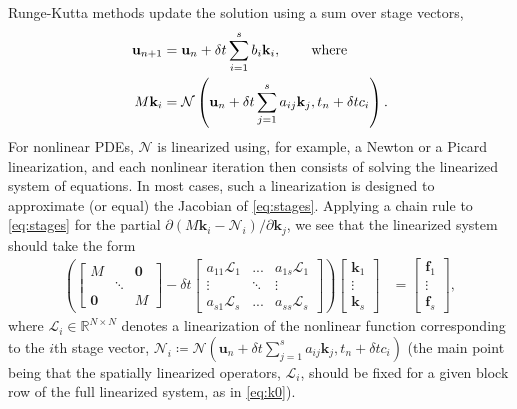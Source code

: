 \documentclass[a4paper,10pt]{article}
\begin{document}
Runge-Kutta methods update the solution using a sum over stage vectors,
%
\begin{align}\label{eq:update}
\mathbf{u}_{n+1} & = \mathbf{u}_n + \delta t \sum_{i=1}^s b_i\mathbf{k}_i, 
	\hspace{5ex}\textnormal{where}\\
M\mathbf{k}_i & = \mathcal{N}\left(\mathbf{u}_n + \delta t\sum_{j=1}^s a_{ij}\mathbf{k}_j, t_n+\delta tc_i\right).\label{eq:stages}
\end{align}
%
For nonlinear PDEs, $\mathcal{N}$ is linearized using, for example, a Newton or a
Picard linearization, and each nonlinear iteration then consists of solving the
linearized system of equations. In most cases, such a linearization
is designed to approximate (or equal) the Jacobian of \eqref{eq:stages}. Applying
a chain rule to \eqref{eq:stages} for the partial
$\partial(M\mathbf{k}_i-\mathcal{N}_i)/\partial\mathbf{k}_j$, we see that
the linearized system should take the form
%
\begin{align}\label{eq:k0}
\left( \begin{bmatrix} M  & & \mathbf{0} \\ & \ddots \\ \mathbf{0} & & M\end{bmatrix}
	- \delta t \begin{bmatrix} a_{11}\mathcal{L}_1 & ... & a_{1s}\mathcal{L}_1 \\
	\vdots & \ddots & \vdots \\ a_{s1}\mathcal{L}_s & ... & a_{ss} \mathcal{L}_s \end{bmatrix} \right)
	\begin{bmatrix} \mathbf{k}_1 \\ \vdots \\ \mathbf{k}_s \end{bmatrix} 
& = \begin{bmatrix} \mathbf{f}_1 \\ \vdots \\ \mathbf{f}_s \end{bmatrix},
\end{align}
%
where $\mathcal{L}_i\in\mathbb{R}^{N\times N}$ denotes a linearization of
the nonlinear function corresponding to the $i$th stage vector,
$\mathcal{N}_i\coloneqq \mathcal{N}\left(\mathbf{u}_n + \delta t\sum_{j=1}^s
a_{ij}\mathbf{k}_j, t_n+\delta tc_i\right)$ (the main point being that the
spatially linearized operators, $\mathcal{L}_i$, should be fixed for a
given block row of the full linearized system, as in \eqref{eq:k0}).
\end{document}
